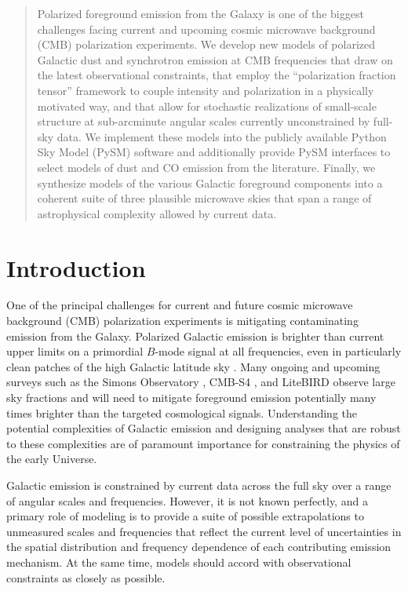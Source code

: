 \documentclass[twocolumn]{aastex631}
\begin{document}
\begin{abstract}
Polarized foreground emission from the Galaxy is one of the biggest challenges facing current and upcoming cosmic microwave background (CMB) polarization experiments. We develop new models of polarized Galactic dust and synchrotron emission at CMB frequencies that draw on the latest observational constraints, that employ the ``polarization fraction tensor'' framework to couple intensity and polarization in a physically motivated way, and that allow for stochastic realizations of small-scale structure at sub-arcminute angular scales currently unconstrained by full-sky data. We implement these models into the publicly available Python Sky Model (PySM) software and additionally provide PySM interfaces to select models of dust and CO emission from the literature. Finally, we synthesize models of the various Galactic foreground components into a coherent suite of three plausible microwave skies that span a range of astrophysical complexity allowed by current data.
\end{abstract}

\section{Introduction}
One of the principal challenges for current and future cosmic microwave background (CMB) polarization experiments is mitigating contaminating emission from the Galaxy. Polarized Galactic emission is brighter than current upper limits on a primordial $B$-mode signal at all frequencies, even in particularly clean patches of the high Galactic latitude sky \citep{planck2016-l11A}. Many ongoing and upcoming surveys such as the Simons Observatory \citep{Ade:2019}, CMB-S4 \citep{Abazajian:2022}, and LiteBIRD \citep{LiteBIRDCollaboration:2023} observe large sky fractions and will need to mitigate foreground emission potentially many times brighter than the targeted cosmological signals. Understanding the potential complexities of Galactic emission and designing analyses that are robust to these complexities are of paramount importance for constraining the physics of the early Universe.

Galactic emission is constrained by current data across the full sky over a range of angular scales and frequencies. However, it is not known perfectly, and a primary role of modeling is to provide a suite of possible extrapolations to unmeasured scales and frequencies that reflect the current level of uncertainties in the spatial distribution and frequency dependence of each contributing emission mechanism. At the same time, models should accord with observational constraints as closely as possible.
\end{document}
